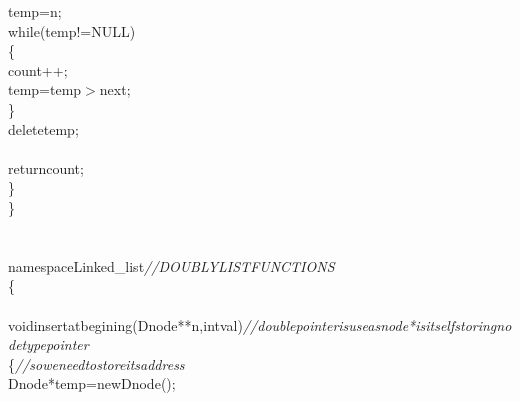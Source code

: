 \documentclass[a4paper, 9pt]{article}
\newcommand\SPC{\hspace*{0.6em}}
\newcommand\TAB{\hspace*{1.2em}}
\newcommand\HYP{\mbox{\char 45}}
\newcommand{\CppAComment}[1]{\textit{\textcolor[rgb]{0.4,0.45,0.48}{#1}}}
\newcommand{\CppAIdentifier}[1]{\textcolor[rgb]{0.88,0.89,0.89}{#1}}
\newcommand{\CppAReservedWord}[1]{\textcolor[rgb]{0.4,0.55,0.69}{#1}}
\newcommand{\CppASpace}[1]{\colorbox[rgb]{0.16,0.19,0.2}{#1}}
\newcommand{\CppASymbol}[1]{\textcolor[rgb]{0.91,0.89,0.72}{#1}}
\begin{document}
\begin{ttfamily}
\CppASpace{\TAB \TAB }\CppAIdentifier{temp}\CppASpace{\SPC }\CppASymbol{=}\CppASpace{\SPC }\CppAIdentifier{n}\CppASymbol{;}\\
\CppASpace{\TAB \TAB }\CppAReservedWord{while}\CppASymbol{(}\CppAIdentifier{temp}\CppASymbol{!=}\CppAIdentifier{NULL}\CppASymbol{)}\\
\CppASpace{\TAB \TAB }\CppASymbol{\{}\\
\CppASpace{\TAB \TAB \TAB }\CppAIdentifier{count}\CppASymbol{++}\CppASymbol{;}\\
\CppASpace{\TAB \TAB \TAB }\CppAIdentifier{temp}\CppASpace{\SPC }\CppASymbol{=}\CppASpace{\SPC }\CppAIdentifier{temp}\CppASymbol{\HYP $>$}\CppAIdentifier{next}\CppASymbol{;}\\
\CppASpace{\TAB \TAB }\CppASymbol{\}}\\
\CppASpace{\TAB \TAB }\CppAReservedWord{delete}\CppASpace{\SPC }\CppAIdentifier{temp}\CppASymbol{;}\\
\CppASpace{\TAB \TAB }\\
\CppASpace{\TAB \TAB }\CppAReservedWord{return}\CppASpace{\SPC }\CppAIdentifier{count}\CppASymbol{;}\\
\CppASpace{\TAB }\CppASymbol{\}}\\
\CppASymbol{\}}\\
\\
\\
\CppAReservedWord{namespace}\CppASpace{\SPC }\CppAIdentifier{Linked\_list}\CppASpace{\SPC \SPC }\CppAComment{//DOUBLYLISTFUNCTIONS}\\
\CppASymbol{\{}\\
\CppASpace{\TAB \TAB }\\
\CppASpace{\TAB }\CppAReservedWord{void}\CppASpace{\SPC \SPC }\CppAIdentifier{insertatbegining}\CppASymbol{(}\CppASpace{\SPC }\CppAIdentifier{Dnode}\CppASymbol{*}\CppASymbol{*}\CppASpace{\SPC }\CppAIdentifier{n}\CppASymbol{,}\CppAReservedWord{int}\CppASpace{\SPC }\CppAIdentifier{val}\CppASymbol{)}\CppAComment{//double\SPC pointer\SPC is\SPC use\SPC as\SPC node\SPC *\SPC is\SPC itself\SPC storing\SPC node\SPC type\SPC pointer\SPC }\\
\CppASpace{\TAB }\CppASymbol{\{}\CppASpace{\SPC \SPC \SPC \SPC \SPC \SPC \SPC \SPC \SPC \SPC \SPC \SPC \SPC \SPC \SPC \SPC \SPC \SPC \SPC \SPC \SPC \SPC \SPC \SPC \SPC \SPC \SPC \SPC }\CppAComment{//\SPC so\SPC we\SPC need\SPC to\SPC store\SPC its\SPC address}\\
\CppASpace{\TAB \TAB }\CppAIdentifier{Dnode}\CppASymbol{*}\CppASpace{\SPC }\CppAIdentifier{temp}\CppASpace{\SPC }\CppASymbol{=}\CppAReservedWord{new}\CppASpace{\SPC }\CppAIdentifier{Dnode}\CppASymbol{(}\CppASymbol{)}\CppASymbol{;}\\

\end{ttfamily}
\end{document}
